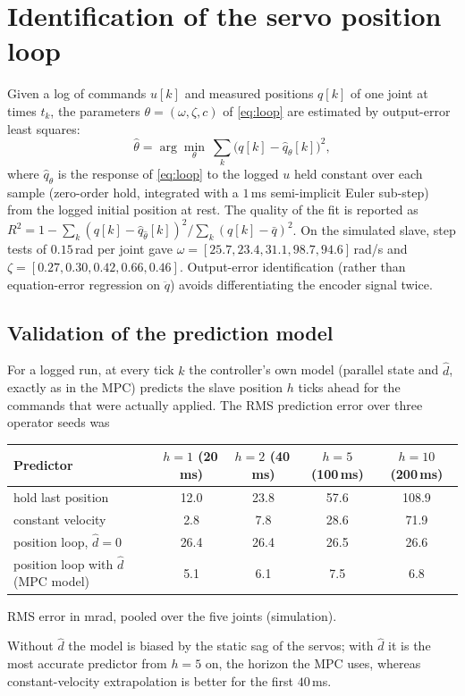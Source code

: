 \documentclass[11pt,a4paper]{article}
\theoremstyle{remark}
\theoremstyle{definition}
\begin{document}
\section{Identification of the servo position loop}\label{sec:ident}
Given a log of commands $u[k]$ and measured positions $q[k]$ of one joint at times $t_k$, the parameters $\theta=(\omega,\zeta,c)$ of \eqref{eq:loop} are estimated by output-error least squares:
\begin{equation}\label{eq:ident}
\hat\theta=\arg\min_\theta\ \sum_k\big(q[k]-\hat q_\theta[k]\big)^2,
\end{equation}
where $\hat q_\theta$ is the response of \eqref{eq:loop} to the logged $u$ held constant over each sample (zero-order hold, integrated with a $1$\,ms semi-implicit Euler sub-step) from the logged initial
position at rest. The quality of the fit is reported as $R^2=1-\sum_k(q[k]-\hat q_{\hat\theta}[k])^2/\sum_k(q[k]-\bar q)^2$. On the simulated slave, step tests of $0.15$\,rad per joint gave
$\omega=[25.7,23.4,31.1,98.7,94.6]$\,rad/s and $\zeta=[0.27,0.30,0.42,0.66,0.46]$. Output-error identification (rather than equation-error regression on $\ddot q$) avoids differentiating
the encoder signal twice.

\subsection{Validation of the prediction model}\label{sec:validation}
For a logged run, at every tick $k$ the controller's own model (parallel state and $\hat d$, exactly as in the MPC) predicts the slave position $h$ ticks ahead for the commands that were actually applied.
The RMS prediction error over three operator seeds was
\begin{center}\small
\begin{tabular}{@{}lcccc@{}}
\toprule
Predictor & $h=1$ (20\,ms) & $h=2$ (40\,ms) & $h=5$ (100\,ms) & $h=10$ (200\,ms)\\
\midrule
hold last position & 12.0 & 23.8 & 57.6 & 108.9\\
constant velocity & 2.8 & 7.8 & 28.6 & 71.9\\
position loop, $\hat d=0$ & 26.4 & 26.4 & 26.5 & 26.6\\
position loop with $\hat d$ (MPC model) & 5.1 & 6.1 & 7.5 & 6.8\\
\bottomrule
\end{tabular}

\smallskip
RMS error in mrad, pooled over the five joints (simulation).
\end{center}
Without $\hat d$ the model is biased by the static sag of the servos; with $\hat d$ it is the most accurate predictor from $h=5$ on, the horizon the MPC uses, whereas constant-velocity extrapolation
is better for the first $40$\,ms.
\end{document}

